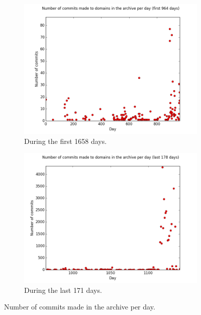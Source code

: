 \documentclass[11pt]{article}
\begin{document}
\begin{figure}
\centering
\begin{subfigure}{.5\textwidth}
  \centering
  \includegraphics[width=\linewidth]{images/commits_per_day_first.png}
  \caption{During the first 1658 days.}
\end{subfigure}%
\begin{subfigure}{.5\textwidth}
  \centering
  \includegraphics[width=\linewidth]{images/commits_per_day_last.png}
  \caption{During the last 171 days.}
\end{subfigure}
\caption{Number of commits made in the archive per day.}
\label{fig:commits_per_day}
\end{figure}
\end{document}
